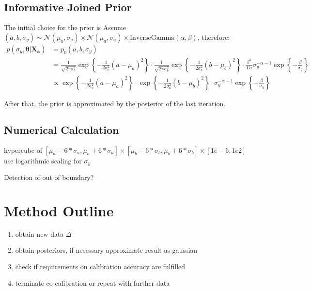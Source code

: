 \documentclass[10pt]{article}
\renewcommand{\vec}[1]{\boldsymbol{#1}}
\begin{document}
\subsection{Informative Joined Prior}
The initial choice for the prior is
\label{sec:initial_informative_prior}
Assume $(a,b,\sigma_y) \sim \mathcal{N}(\mu_a, \sigma_a) \times \mathcal{N}(\mu_a, \sigma_a) \times \text{InverseGamma}(\alpha, \beta) $, therefore:
\begin{align}
    p(\sigma_y, \vec{\theta} | \vec{X_a}) &= p_0(a, b, \sigma_y) \\
    &= 
    \frac{1}{\sqrt{2 \pi \sigma_{a}^2}} \exp\left\{ - \frac{1}{2\sigma_{a}^2} ( a - \mu_{a} )^2 \right\} \cdot 
    \frac{1}{\sqrt{2 \pi \sigma_{b}^2}} \exp\left\{ - \frac{1}{2\sigma_{b}^2} ( b - \mu_{b} )^2 \right\} \cdot
    \frac{\beta^{\alpha}}{\Gamma{\alpha}} \sigma_y^{-\alpha-1} \exp\left\{ - \frac{\beta}{\sigma_y} \right\} \\
    &\propto 
    \exp\left\{ - \frac{1}{2\sigma_{a}^2} ( a - \mu_{a} )^2 \right\} \cdot 
    \exp\left\{ - \frac{1}{2\sigma_{b}^2} ( b - \mu_{b} )^2 \right\} \cdot
    \sigma_y^{-\alpha-1} \exp\left\{ - \frac{\beta}{\sigma_y} \right\} 
\end{align}

After that, the prior is approximated by the posterior of the last iteration.

\subsection{Numerical Calculation}
hypercube of $[\mu_a - 6 * \sigma_a, \mu_a + 6 * \sigma_a] \times [\mu_b - 6 * \sigma_b, \mu_b + 6 * \sigma_b] \times [1e-6, 1e2]$
use logarithmic scaling for $\sigma_y$

Detection of out of boundary?


\section{Method Outline}
\begin{enumerate}
    \item obtain new data $\Delta$
    \item obtain posteriors, if necessary approximate result as gaussian
    \item check if requirements on calibration accuracy are fulfilled
    \item terminate co-calibration or repeat with further data
\end{enumerate}



    
\end{document}
